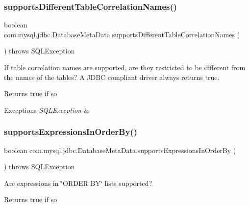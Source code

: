 \subsubsection{\texorpdfstring{supports\+Different\+Table\+Correlation\+Names()}{supportsDifferentTableCorrelationNames()}}
{\footnotesize\ttfamily boolean com.\+mysql.\+jdbc.\+Database\+Meta\+Data.\+supports\+Different\+Table\+Correlation\+Names (\begin{DoxyParamCaption}{ }\end{DoxyParamCaption}) throws S\+Q\+L\+Exception}

If table correlation names are supported, are they restricted to be different from the names of the tables? A J\+D\+BC compliant driver always returns true.

\begin{DoxyReturn}{Returns}
true if so 
\end{DoxyReturn}

\begin{DoxyExceptions}{Exceptions}
{\em S\+Q\+L\+Exception} & \\
\hline
\end{DoxyExceptions}
\mbox{\label{classcom_1_1mysql_1_1jdbc_1_1_database_meta_data_a4ca7a6366d8496681da61acb961c6b67}} 
\subsubsection{\texorpdfstring{supports\+Expressions\+In\+Order\+By()}{supportsExpressionsInOrderBy()}}
{\footnotesize\ttfamily boolean com.\+mysql.\+jdbc.\+Database\+Meta\+Data.\+supports\+Expressions\+In\+Order\+By (\begin{DoxyParamCaption}{ }\end{DoxyParamCaption}) throws S\+Q\+L\+Exception}

Are expressions in \char`\"{}\+O\+R\+D\+E\+R B\+Y\char`\"{} lists supported?

\begin{DoxyReturn}{Returns}
true if so 
\end{DoxyReturn}


